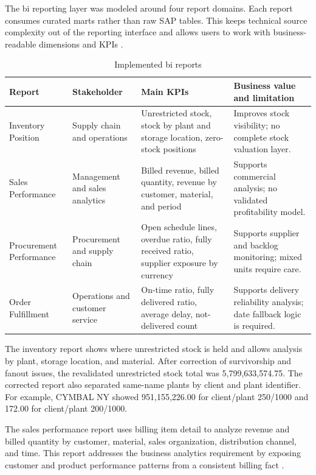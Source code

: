The \ac{bi} reporting layer was modeled around four report domains. Each report consumes curated marts rather than raw SAP tables. This keeps technical source complexity out of the reporting interface and allows users to work with business-readable dimensions and KPIs \parencite{moody_enterprise_2000}.

\begin{table}[htbp]
\centering
\small
\caption{Implemented \ac{bi} reports}
\label{tab:report-portfolio-condensed}
\begin{tabular}{p{} p{} p{} p{}}
\hline
\textbf{Report} & \textbf{Stakeholder} & \textbf{Main KPIs} & \textbf{Business value and limitation} \\
\hline
Inventory Position & Supply chain and operations & Unrestricted stock, stock by plant and storage location, zero-stock positions & Improves stock visibility; no complete stock valuation layer. \\
Sales Performance & Management and sales analytics & Billed revenue, billed quantity, revenue by customer, material, and period & Supports commercial analysis; no validated profitability model. \\
Procurement Performance & Procurement and supply chain & Open schedule lines, overdue ratio, fully received ratio, supplier exposure by currency & Supports supplier and backlog monitoring; mixed units require care. \\
Order Fulfillment & Operations and customer service & On-time ratio, fully delivered ratio, average delay, not-delivered count & Supports delivery reliability analysis; date fallback logic is required. \\
\hline
\end{tabular}
\normalsize
\end{table}

The inventory report shows where unrestricted stock is held and allows analysis by plant, storage location, and material. After correction of survivorship and fanout issues, the revalidated unrestricted stock total was 5,799,633,574.75. The corrected report also separated same-name plants by client and plant identifier. For example, CYMBAL NY showed 951,155,226.00 for client/plant 250/1000 and 172.00 for client/plant 200/1000.

The sales performance report uses billing item detail to analyze revenue and billed quantity by customer, material, sales organization, distribution channel, and time. This report addresses the business analytics requirement by exposing customer and product performance patterns from a consistent billing fact \parencite{takacs_data_2020}.

